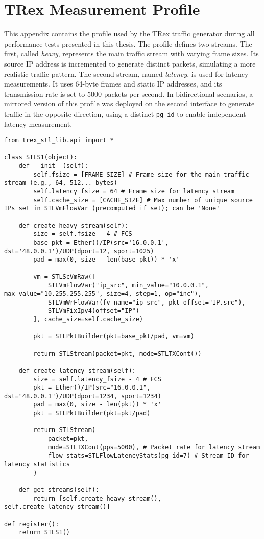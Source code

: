 \chapter{TRex Measurement Profile}
\label{appendix:trex-profile}

This appendix contains the profile used by the TRex traffic generator during all performance tests presented in this thesis.  
The profile defines two streams. The first, called \textit{heavy}, represents the main traffic stream with varying frame sizes.  
Its source IP address is incremented to generate distinct packets, simulating a more realistic traffic pattern.  
The second stream, named \textit{latency}, is used for latency measurements. It uses 64-byte frames and static IP addresses, and its transmission rate is set to 5000 packets per second.  
In bidirectional scenarios, a mirrored version of this profile was deployed on the second interface to generate traffic in the opposite direction, using a distinct \texttt{pg\_id} to enable independent latency measurement.

\begin{lstlisting}[caption={TRex Measurement Profile Example}]
from trex_stl_lib.api import *

class STLS1(object):
    def __init__(self):
        self.fsize = [FRAME_SIZE] # Frame size for the main traffic stream (e.g., 64, 512... bytes)
        self.latency_fsize = 64 # Frame size for latency stream
        self.cache_size = [CACHE_SIZE] # Max number of unique source IPs set in STLVmFlowVar (precomputed if set); can be 'None'

    def create_heavy_stream(self):
        size = self.fsize - 4 # FCS
        base_pkt = Ether()/IP(src='16.0.0.1', dst='48.0.0.1')/UDP(dport=12, sport=1025)
        pad = max(0, size - len(base_pkt)) * 'x'

        vm = STLScVmRaw([
            STLVmFlowVar("ip_src", min_value="10.0.0.1", max_value="10.255.255.255", size=4, step=1, op="inc"),
            STLVmWrFlowVar(fv_name="ip_src", pkt_offset="IP.src"),
            STLVmFixIpv4(offset="IP")
        ], cache_size=self.cache_size)

        pkt = STLPktBuilder(pkt=base_pkt/pad, vm=vm)

        return STLStream(packet=pkt, mode=STLTXCont())

    def create_latency_stream(self):
        size = self.latency_fsize - 4 # FCS
        pkt = Ether()/IP(src="16.0.0.1", dst="48.0.0.1")/UDP(dport=1234, sport=1234)
        pad = max(0, size - len(pkt)) * 'x'
        pkt = STLPktBuilder(pkt=pkt/pad)

        return STLStream(
            packet=pkt,
            mode=STLTXCont(pps=5000), # Packet rate for latency stream
            flow_stats=STLFlowLatencyStats(pg_id=7) # Stream ID for latency statistics
        )

    def get_streams(self):
        return [self.create_heavy_stream(), self.create_latency_stream()]

def register():
    return STLS1()

\end{lstlisting}

